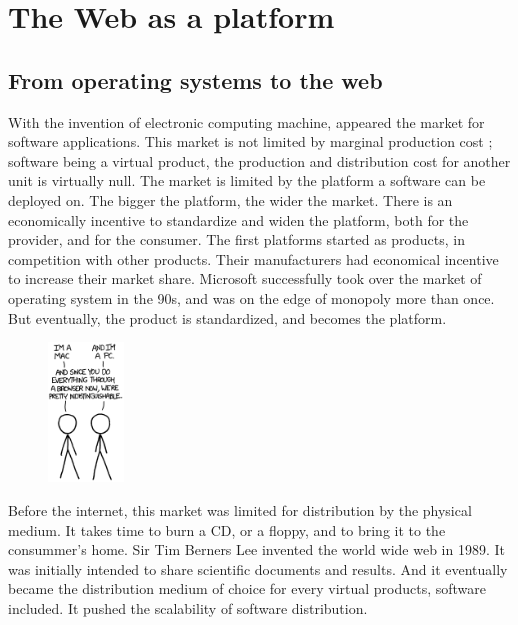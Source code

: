 \section{The Web as a platform} \label{chapter2:web-as-a-platform}

\subsection{From operating systems to the web}


With the invention of electronic computing machine, appeared the market for software applications.
This market is not limited by marginal production cost ; software being a virtual product, the production and distribution cost for another unit is virtually null.
The market is limited by the platform a software can be deployed on.
The bigger the platform, the wider the market.
There is an economically incentive to standardize and widen the platform, both for the provider, and for the consumer.
The first platforms started as products, in competition with other products.
Their manufacturers had economical incentive to increase their market share.
Microsoft successfully took over the market of operating system in the 90s, and was on the edge of monopoly more than once.
But eventually, the product is standardized, and becomes the platform.

\begin{figure}
  \vspace{-27pt}
  \begin{center}
    \includegraphics[width=0.18\textwidth]{../ressources/Mac-PC.png}
  \end{center}
  \vspace{-20pt}
\end{figure}

Before the internet, this market was limited for distribution by the physical medium.
It takes time to burn a CD, or a floppy, and to bring it to the consummer's home.
Sir Tim Berners Lee invented the world wide web in 1989.
It was initially intended to share scientific documents and results.
And it eventually became the distribution medium of choice for every virtual products, software included.
It pushed the scalability of software distribution.


